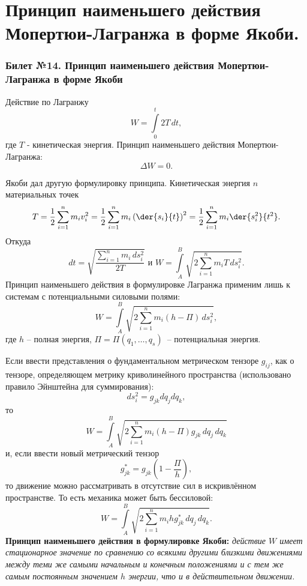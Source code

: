 \chapter{Принцип наименьшего действия Мопертюи-Лагранжа в форме Якоби.}
\subsection{Билет №14. Принцип наименьшего действия Мопертюи-Лагранжа в форме Якоби}

Действие по Лагранжу
\[
    W = \int\limits_{0}^t 2T\,dt,
\]
где \( T \) - кинетическая энергия. Принцип наименьшего действия
Мопертюи-Лагранжа:
\[
    \Delta W = 0.
\]

Якоби дал другую формулировку принципа. Кинетическая энергия \( n \)
материальных точек
\[
    T = \frac{1}{2}\sum\limits_{i=1}^{n} m_i v_i^2 = 
    \frac{1}{2}\sum\limits_{i=1}^{n} m_i \left(\der{s_i}{t}\right)^2 = 
    \frac{1}{2}\sum\limits_{i=1}^{n} m_i \der{s_i^2}{t^2}.
\]
Откуда 
\[
    dt = \sqrt{\frac{\sum\limits_{i=1}^{n} m_i\,ds_i^2}{2T}} \text{ и }
    W = \int\limits_{A}^B \sqrt{{2\sum\limits_{i=1}^{n} m_i T\,ds_i^2}}.
\]
Принцип наименьшего действия в формулировке Лагранжа применим лишь к системам
с потенциальными силовыми полями:
\[
    W = \int\limits_{A}^B \sqrt{{2\sum\limits_{i=1}^{n} m_i {(h-\Pi)}\,ds_i^2}},
\]
где \( h \) -- полная энергия, \( \Pi = \Pi(q_1, \dots, q_s) \)~--
потенциальная энергия.

Если ввести представления о фундаментальном метрическом тензоре \( g_{ij} \),
как о тензоре, определяющем метрику криволинейного пространства 
(использовано правило Эйнштейна для суммирования):
\[
    ds_i^2 = g_{jk}dq_jdq_k,
\]
то 
\[
    W = \int\limits_{A}^B
    \sqrt{{2\sum\limits_{i=1}^{n} m_i (h-\Pi) g_{jk}\,dq_j\,dq_k}}
\]
и, если ввести новый метрический тензор
\[
    g_{jk}^* = g_{jk}\left(1-\frac{\Pi}{h}\right),
\]
то движение можно рассматривать в отсутствие сил в искривлённом пространстве.
То есть механика может быть бессиловой:
\[
    W = \int\limits_{A}^B
    \sqrt{{2\sum\limits_{i=1}^{n} m_i h g_{jk}^*\,dq_j\,dq_k}}.
\] 
\textbf{Принцип наименьшего действия в формулировке Якоби:}
\emph{действие \( W \) имеет стационарное значение по сравнению со всякими
другими близкими движениями между теми же самыми начальным и
конечным положениями и с тем же самым постоянным значением \( h \) энергии,
что и в действительном движении.}
\newpage
